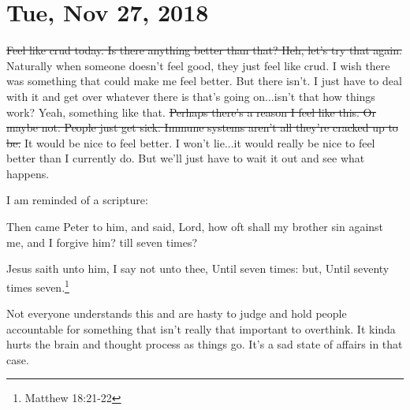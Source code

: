\section{Tue, Nov 27, 2018}

\st{Feel like crud today. Is there anything better than that? Heh, let's try that
again.} Naturally when someone doesn't feel good, they just feel like crud. I wish
there was something that could make me feel better. But there isn't. I just have to
deal with it and get over whatever there is that's going on...isn't that how things
work? Yeah, something like that. \st{Perhaps there's a reason I feel like this. Or
maybe not. People just get sick. Immune systems aren't all they're cracked up to be.}
It would be nice to feel better. I won't lie...it would really be nice to feel better
than I currently do. But we'll just have to wait it out and see what happens.

I am reminded of a scripture:

\begin{displayquote}
Then came Peter to him, and said, Lord, how oft shall my brother sin against me, and 
I forgive him? till seven times?

Jesus saith unto him, I say not unto thee, Until seven times: but, Until seventy 
times seven.\footnote{Matthew 18:21-22}
\end{displayquote}

Not everyone understands this and are hasty to judge and hold people accountable for
something that isn't really that important to overthink. It kinda hurts the brain and
thought process as things go. It's a sad state of affairs in that case.